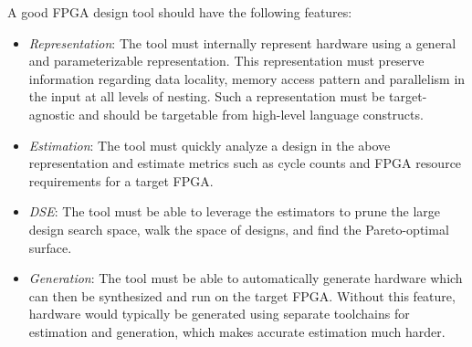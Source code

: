 A good FPGA design tool should have the following features:
\begin{itemize}
  \item \emph{Representation}: The tool must internally represent hardware using a general and parameterizable
    representation. This representation must preserve information regarding data locality,
    memory access pattern and parallelism in the input at all levels of nesting.
    Such a representation must be target-agnostic and should be targetable from high-level
    language constructs.
  \item \emph{Estimation}: The tool must quickly analyze a design in the above representation
    and estimate metrics such as cycle counts and FPGA resource requirements for a target FPGA.
  \item \emph{DSE}: The tool must be able to leverage the estimators to prune the large design search space,
    walk the space of designs, and find the Pareto-optimal surface.
  \item \emph{Generation}: The tool must be able to automatically generate hardware which can then be
    synthesized and run on the target FPGA. Without this feature, hardware would typically
    be generated using separate toolchains for estimation and generation, which makes
    accurate estimation much harder.
\end{itemize}
